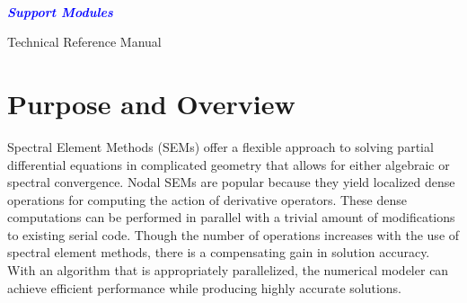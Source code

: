 \documentclass[12pt]{softwaremanual}
\author{Joseph Schoonover}
\title{}
\date{}
\begin{document}
\begin{titlingpage}
    
        \vspace*{2cm}
        
     \begin{flushright}
        {\selectfont
        \\
        }
       
        \vspace{1cm}
        
        \huge{
        \textbf{
        \textit{
        \textcolor{blue}{
           Support Modules
        }}}}
        
     \end{flushright}
         
        \vspace{2cm}
        
     \begin{center}
     
        {\selectfont
        \huge{
           Technical Reference Manual
        }
        
        \vspace{1.5cm}
        
        \textbf{
        \large{
           \theauthor 
         }}}
        
        \vfill
        
        
        \vspace{0.8cm}
        
     \end{center}
        
    
\end{titlingpage}



\tableofcontents

\pagestyle{myheadings}
\chapter{Purpose and Overview}
 Spectral Element Methods (SEMs) offer a flexible approach to solving partial differential equations in complicated geometry that allows for either algebraic or spectral convergence. Nodal SEMs are popular because they yield localized dense operations for computing the action of derivative operators. These dense computations can be performed in parallel with a trivial amount of modifications to existing serial code. Though the number of operations increases with the use of spectral element methods, there is a compensating gain in solution accuracy. With an algorithm that is appropriately parallelized, the numerical modeler can achieve efficient performance while producing highly accurate solutions.
 
\end{document}
